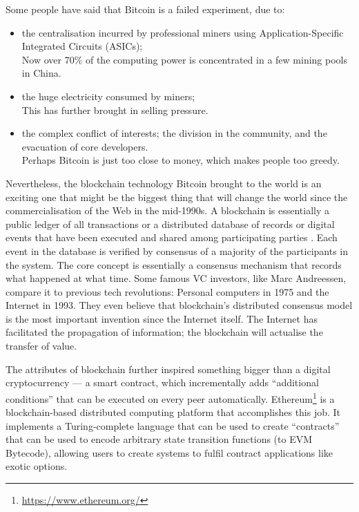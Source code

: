 Some people have said that Bitcoin is a failed experiment, due to:
\begin{itemize}
	\item the centralisation incurred by professional miners using Application-Specific Integrated Circuits (ASICs);\\
	Now over 70\% of the computing power is concentrated in a few mining pools in China. 
	\item the huge electricity consumed by miners;\\
	This has further brought in selling pressure. 
	\item  the complex conflict of interests; the division in the community, and the evacuation of core developers.\\
	Perhaps Bitcoin is just too close to money, which makes people too greedy. 
\end{itemize}

Nevertheless, the blockchain technology Bitcoin brought to the world is an exciting one that might be the biggest thing that will change the world since the commercialisation of the Web in the mid-1990s. A blockchain is essentially a public ledger of all transactions or a distributed database of records or digital events that have been executed and shared among participating parties \cite{blockchain-tech}. Each event in the database is verified by consensus of a majority of the participants in the system. The core concept is essentially a consensus mechanism that records what happened at what time. Some famous VC investors, like Marc Andreessen, compare it to previous tech revolutions: Personal computers in 1975 and the Internet in 1993. They even believe that blockchain's distributed consensus model is the most important invention since the Internet itself. The Internet has facilitated the propagation of information; the blockchain will actualise the transfer of value. 

The attributes of blockchain further inspired something bigger than a digital cryptocurrency --- a smart contract, which incrementally adds ``additional conditions'' that can be executed on every peer automatically. Ethereum\footnote{\url{https://www.ethereum.org/}} is a blockchain-based distributed computing platform that accomplishes this job. It implements a Turing-complete language that can be used to create ``contracts'' that can be used to encode arbitrary state transition functions (to EVM Bytecode), allowing users to create systems to fulfil contract applications like exotic options. 

